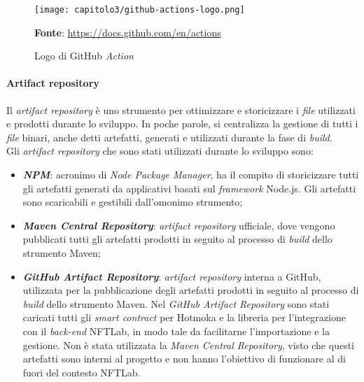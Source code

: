 \begin{figure}[h!]
  \centering
  \texttt{[image: capitolo3/github-actions-logo.png]}
  \caption{Logo di GitHub \textit{Action}}
  \textbf{Fonte}: \href{https://docs.github.com/en/actions}{https://docs.github.com/en/actions}
\end{figure}

\paragraph{Artifact repository}
Il \textit{artifact repository} è uno strumento per ottimizzare e storicizzare i \textit{file} utilizzati e prodotti durante lo sviluppo. In poche parole, si centralizza la gestione di tutti i \textit{file} binari, anche detti artefatti, generati e utilizzati durante la fase di \textit{build}. \\

\noindent Gli \textit{artifact repository} che sono stati utilizzati durante lo sviluppo sono:
\begin{itemize}
  \item \textbf{\textit{NPM}}: acronimo di \textit{Node Package Manager}, ha il compito di storicizzare tutti gli artefatti generati da applicativi basati sul \textit{framework} Node.js. Gli artefatti sono scaricabili e gestibili dall'omonimo strumento;
  \item \textbf{\textit{Maven Central Repository}}: \textit{artifact repository} ufficiale, dove vengono pubblicati tutti gli artefatti prodotti in seguito al processo di \textit{build} dello strumento Maven;
  \item \textbf{\textit{GitHub Artifact Repository}}: \textit{artifact repository} interna a GitHub, utilizzata per la pubblicazione degli artefatti prodotti in seguito al processo di \textit{build} dello strumento Maven. Nel \textit{GitHub Artifact Repository} sono stati caricati tutti gli \textit{smart contract} per Hotmoka e la libreria per l'integrazione con il \textit{back-end} NFTLab, in modo tale da facilitarne l'importazione e la gestione. Non è stata utilizzata la \textit{Maven Central Repository}, visto che questi artefatti sono interni al progetto e non hanno l'obiettivo di funzionare al di fuori del contesto NFTLab.
\end{itemize}


